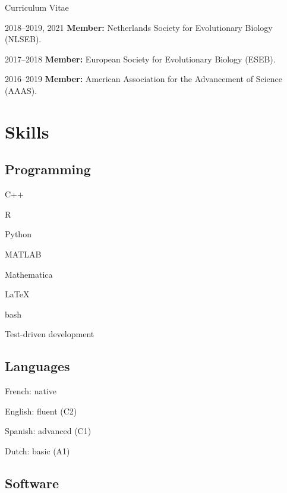\documentclass[11pt,a4paper]{article}
\begin{document}
\begin{cv}{Curriculum Vitae}
\begin{cvlist}{}
			\item[2018--2019, 2021] \textbf{Member:} Netherlands Society for Evolutionary Biology (NLSEB).
			
			\item[2017--2018] \textbf{Member:} European Society for Evolutionary Biology (ESEB).
			
			\item[2016--2019] \textbf{Member:} American Association for the Advancement of Science (AAAS).
			
		\end{cvlist}
		
		\section{Skills}
		
		\subsection{Programming}
		
		\begin{cvlist}{}
		
			\item C++
			\item R
			\item Python
			\item MATLAB
			\item Mathematica
			\item LaTeX
			\item bash
			\item Test-driven development
		
		\end{cvlist}
	
		\subsection{Languages}
		
		\begin{cvlist}{}
			
			\item French: native
			\item English: fluent (C2)
			\item Spanish: advanced (C1)
			\item Dutch: basic (A1)
			
		\end{cvlist}
	
		\subsection{Software}
		

\end{cv}
\end{document}
